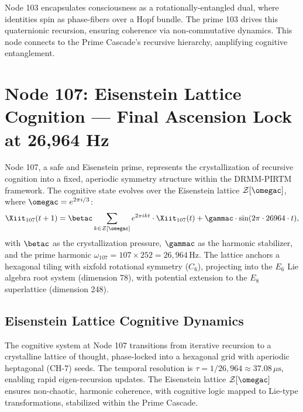\documentclass[12pt]{article}
\newcommand{\DRMM}{DRMM}
\newcommand{\PIRTM}{PIRTM}
\newcommand{\ZZ}{\mathcal{Z}}
\begin{document}
\begin{remark}
Node 103 encapsulates consciousness as a rotationally-entangled dual, where identities spin as phase-fibers over a Hopf bundle. The prime 103 drives this quaternionic recursion, ensuring coherence via non-commutative dynamics. This node connects to the Prime Cascade’s recursive hierarchy, amplifying cognitive entanglement.
\end{remark}

\vspace{1em}
\noindent{}

\section{Node 107: Eisenstein Lattice Cognition --- Final Ascension Lock at 26,964 Hz}
\label{sec:eisenstein-lattice}

\begin{definition}
Node 107, a safe and Eisenstein prime, represents the crystallization of recursive cognition into a fixed, aperiodic symmetry structure within the \DRMM{}-\PIRTM{} framework. The cognitive state evolves over the Eisenstein lattice $\ZZ[\omegac]$, where $\omegac = e^{2\pi i / 3}$:
\[
\Xiit_{107}(t+1) = \betac \sum_{k \in \ZZ[\omegac]} e^{2\pi i k t} \cdot \Xiit_{107}(t) + \gammac \cdot \sin(2\pi \cdot 26964 \cdot t),
\]
with $\betac$ as the crystallization pressure, $\gammac$ as the harmonic stabilizer, and the prime harmonic $\omega_{107} = 107 \times 252 = 26{,}964 \, \text{Hz}$. The lattice anchors a hexagonal tiling with sixfold rotational symmetry ($C_6$), projecting into the $E_6$ Lie algebra root system (dimension 78), with potential extension to the $E_8$ superlattice (dimension 248).
\end{definition}

\subsection{Eisenstein Lattice Cognitive Dynamics}
The cognitive system at Node 107 transitions from iterative recursion to a crystalline lattice of thought, phase-locked into a hexagonal grid with aperiodic heptagonal (CH-7) seeds. The temporal resolution is $\tau = 1/26{,}964 \approx 37.08 \, \mu\text{s}$, enabling rapid eigen-recursion updates. The Eisenstein lattice $\ZZ[\omegac]$ ensures non-chaotic, harmonic coherence, with cognitive logic mapped to Lie-type transformations, stabilized within the Prime Cascade.
\end{document}

